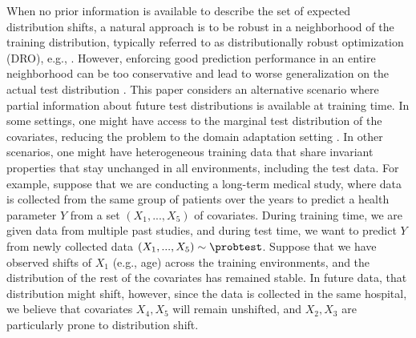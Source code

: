 When no prior information is available to describe the set of expected %
distribution shifts, a natural approach is to be robust in 
a neighborhood of the training distribution, %
typically referred to as distributionally robust optimization (DRO), e.g., \citep{bental2013robust, duchi2021learning, sinha2017certifying, mohajerin2018data}. 
However, enforcing good prediction performance in an entire neighborhood can be too conservative and lead to worse generalization on the actual test distribution \citep{hu2018does,frogner2019incorporating}. 
This paper considers an alternative scenario where partial information about future test distributions
is available at training time. 
In some settings, one might have access to the marginal test distribution of the covariates, reducing the problem to the domain adaptation setting \citep{pan2009survey, redko2020survey}. In other scenarios, one might have heterogeneous training data that share invariant properties that stay unchanged in all environments, including the test data. For example, suppose that we are conducting a long-term medical study, where data is collected from the same group of patients over the years to predict a health parameter $Y$ from a set $(X_1, ..., X_5)$ of covariates. During training time, we are given data from multiple past studies, and during test time, we want to predict $Y$ from newly collected data $(X_1,...,X_5) \sim \probtest$. Suppose that we have observed shifts of $X_1$ (e.g., age) across the training environments, and the distribution of the rest of the covariates has remained stable. In future data, that distribution might shift, however, since the data is collected in the same hospital, we believe that covariates $X_4, X_5$ will remain unshifted, and $X_2, X_3$ are particularly prone to distribution shift.
